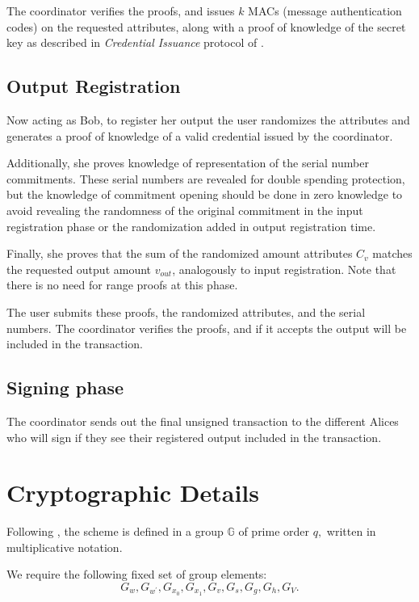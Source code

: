 \documentclass{article}
\begin{document}
The coordinator verifies the proofs, and issues $k$ MACs (message authentication codes) on the requested attributes, along with a proof of knowledge of the secret key as described in \textit{Credential Issuance} protocol of \cite{chase2019signal}.

\subsection{Output Registration}

Now acting as Bob, to register her output the user randomizes the attributes and generates a proof of knowledge of a valid credential issued by the coordinator.

Additionally, she proves knowledge of representation of the serial number commitments. These serial numbers are revealed for double spending protection, but the knowledge of commitment opening should be done in zero knowledge to avoid revealing the randomness of the original commitment in the input registration phase or the randomization added in output registration time.

Finally, she proves that the sum of the randomized amount attributes $C_v$ matches the requested output amount $v_{\mathit{out}}$, analogously to input registration. Note that there is no need for range proofs at this phase.

The user submits these proofs, the randomized attributes, and the serial numbers. The coordinator verifies the proofs, and if it accepts the output will be included in the transaction.

\subsection{Signing phase}
The coordinator sends out the final unsigned transaction to the different Alices who will sign if they see their registered output included in the transaction.

\section{Cryptographic Details}

Following \cite{chase2019signal}, the scheme is defined in a group \(\mathbb{G}\) of prime order \(q,\) written in multiplicative notation.

We require the following fixed set of group elements:
\[
G_{w}, G_{w^{\prime}}, G_{x_{0}}, G_{x_{1}},
G_{v}, G_{s}, G_g, G_h,
G_{V}.
\]
\end{document}
